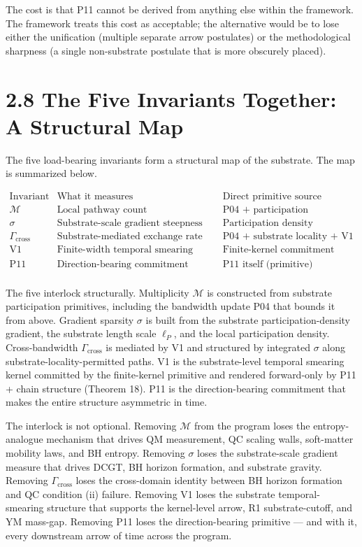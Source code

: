 \documentclass[11pt]{book}
\begin{document}
The cost is that P11 cannot be derived from anything else within the framework. The framework treats this cost as acceptable; the alternative would be to lose either the unification (multiple separate arrow postulates) or the methodological sharpness (a single non-substrate postulate that is more obscurely placed).

\section{2.8 The Five Invariants Together: A Structural Map}

The five load-bearing invariants form a structural map of the substrate. The map is summarized below.

\[
\begin{array}{l|l|l}
\text{Invariant} & \text{What it measures} & \text{Direct primitive source} \\
\hline
\mathcal{M} & \text{Local pathway count} & \text{P04 + participation primitives} \\
\sigma & \text{Substrate-scale gradient steepness} & \text{Participation density primitives} \\
\Gamma_\mathrm{cross} & \text{Substrate-mediated exchange rate} & \text{P04 + substrate locality + V1} \\
\text{V1} & \text{Finite-width temporal smearing kernel} & \text{Finite-kernel commitment} \\
\text{P11} & \text{Direction-bearing commitment} & \text{P11 itself (primitive)} \\
\end{array}
\]

The five interlock structurally. Multiplicity $\mathcal{M}$ is constructed from substrate participation primitives, including the bandwidth update P04 that bounds it from above. Gradient sparsity $\sigma$ is built from the substrate participation-density gradient, the substrate length scale $\ell_P$, and the local participation density. Cross-bandwidth $\Gamma_\mathrm{cross}$ is mediated by V1 and structured by integrated $\sigma$ along substrate-locality-permitted paths. V1 is the substrate-level temporal smearing kernel committed by the finite-kernel primitive and rendered forward-only by P11 + chain structure (Theorem 18). P11 is the direction-bearing commitment that makes the entire structure asymmetric in time.

The interlock is not optional. Removing $\mathcal{M}$ from the program loses the entropy-analogue mechanism that drives QM measurement, QC scaling walls, soft-matter mobility laws, and BH entropy. Removing $\sigma$ loses the substrate-scale gradient measure that drives DCGT, BH horizon formation, and substrate gravity. Removing $\Gamma_\mathrm{cross}$ loses the cross-domain identity between BH horizon formation and QC condition (ii) failure. Removing V1 loses the substrate temporal-smearing structure that supports the kernel-level arrow, R1 substrate-cutoff, and YM mass-gap. Removing P11 loses the direction-bearing primitive — and with it, every downstream arrow of time across the program.
\end{document}
